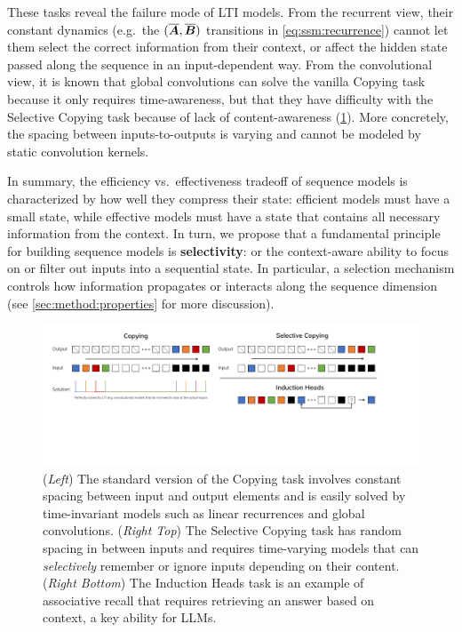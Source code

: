 These tasks reveal the failure mode of LTI models. From the recurrent view, their constant dynamics (e.g.\ the $(\overline{\bm{A}}, \overline{\bm{B}})$ transitions in \eqref{eq:ssm:recurrence}) cannot let them select the correct information from their context, or affect the hidden state passed along the sequence in an input-dependent way.
From the convolutional view, it is known that global convolutions can solve the vanilla Copying task \citep{romero2021ckconv} because it only requires time-awareness, but that they have difficulty with the Selective Copying task because of lack of content-awareness (\cref{fig:copying}).
More concretely, the spacing between inputs-to-outputs is varying and cannot be modeled by static convolution kernels.

In summary, the efficiency vs.\ effectiveness tradeoff of sequence models is characterized by how well they compress their state:
efficient models must have a small state, while effective models must have a state that contains all necessary information from the context.
In turn, we propose that a fundamental principle for building sequence models is
\textbf{selectivity}: or the context-aware ability to focus on or filter out inputs into a sequential state.
In particular, a selection mechanism controls how information propagates or interacts along the sequence dimension (see \cref{sec:method:properties} for more discussion).

%

%

%

\begin{figure}[!t]
  \centering
  \includegraphics[width=\linewidth]{fig/copying.pdf}
  \caption{
    (\textit{Left}) The standard version of the Copying task involves constant spacing between input and output elements and is easily solved by time-invariant models such as linear recurrences and global convolutions.
    (\textit{Right Top}) The Selective Copying task has random spacing in between inputs and requires time-varying models that can \textit{selectively} remember or ignore inputs depending on their content.
    (\textit{Right Bottom}) The Induction Heads task is an example of associative recall that requires retrieving an answer based on context, a key ability for LLMs.
  }
  \label{fig:copying}
  \iftoggle{arxiv}{}{\vspace{-1em}}
\end{figure}


